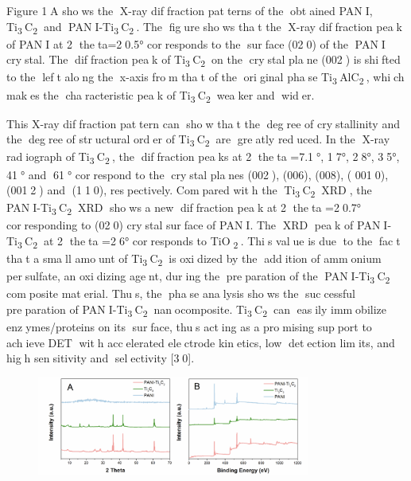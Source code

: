 {Figure 1A shows the X-ray diffraction patterns of the obtained
PANI, Ti\textsubscript{3}C\textsubscript{2} and
PANI-Ti\textsubscript{3}C\textsubscript{2}. The figure shows that
the X-ray diffraction peak of PANI at 2 theta=20.5° corresponds
to the surface (020) of the PANI crystal. The diffraction peak
of Ti\textsubscript{3}C\textsubscript{2} on the crystal plane
(002) is shifted to the left along the x-axis from that of the
original phase Ti\textsubscript{3}AlC\textsubscript{2}, which
makes the characteristic peak of
Ti\textsubscript{3}C\textsubscript{2} weaker and wider.

This X-ray diffraction pattern can show that the degree of
crystallinity and the degree of structural order of
Ti\textsubscript{3}C\textsubscript{2} are greatly reduced. In the
X-ray radiograph of Ti\textsubscript{3}C\textsubscript{2}, the
diffraction peaks at 2 theta =7.1°, 17°, 28°, 35°, 41° and
61° correspond to the crystal planes (002), (006), (008), (
0010), (0012) and (110), respectively. Compared with the
Ti\textsubscript{3}C\textsubscript{2} XRD, the
PANI-Ti\textsubscript{3}C\textsubscript{2} XRD shows a new
diffraction peak at 2 theta =20.7° corresponding to (020)
crystal surface of PANI. The XRD peak of
PANI-Ti\textsubscript{3}C\textsubscript{2} at 2 theta =26°
corresponds to TiO\textsubscript{2}. This value is due to the
fact that a small amount of Ti\textsubscript{3}C\textsubscript{2}
is oxidized by the addition of ammonium persulfate, an oxidizing
agent, during the preparation of the
PANI-Ti\textsubscript{3}C\textsubscript{2} composite material.
Thus, the phase analysis shows the successful preparation of
PANI-Ti\textsubscript{3}C\textsubscript{2} nanocomposite.
Ti\textsubscript{3}C\textsubscript{2} can easily immobilize
enzymes/proteins on its surface, thus acting as a promising
support to achieve DET with accelerated electrode kinetics, low
detection limits, and high sensitivity and selectivity {[}30{]}.

\begin{figure}[H]
	\centering
	\includegraphics[width=0.8\textwidth]{media/chem2/image15}
	\caption*{}
\end{figure}


}
